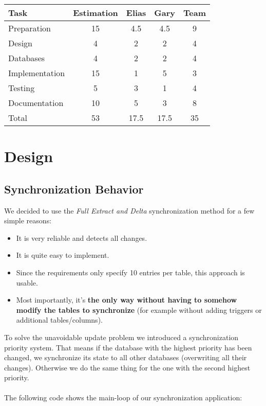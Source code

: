 \documentclass[11pt, a4paper]{article}
\begin{document}
\parskip 12pt
\begin{tabular} {| l | c | c | c | c |}
	\hline
	Task					&	Estimation		& 	Elias 	& 	Gary 	& 	Team	\\ \hline \hline
	Preparation				&	15				&	4.5		&  	4.5		&	9		\\ \hline
	Design					&	4				&	2		&	2		&	4		\\ \hline
	Databases				&	4				&	2  		&	2 		& 	4		\\ \hline
	Implementation			&	15				&	1		&	5		& 	3 		\\ \hline
	Testing					&	5				&	3		& 	1 		& 	4 		\\ \hline
	Documentation			&	10				&	5		&	3 		& 	8		\\ \hline 
	Total					&	53				&	17.5	&	17.5	& 	35		\\
	\hline
\end{tabular}

\section{Design}

\subsection {Synchronization Behavior}

We decided to use the \textit{Full Extract and Delta} synchronization method for a few simple reasons:

\vspace{-10pt}
\begin{itemize}[noitemsep]
	\item It is very reliable and detects all changes.
	\item It is quite easy to implement.
	\item Since the requirements only specify 10 entries per table, this approach is usable.
	\item Most importantly, it's \textbf{the only way without having to somehow modify the tables to synchronize} (for example without adding triggers or additional tables/columns).
\end{itemize}
\vspace{-10pt}

To solve the unavoidable update problem we introduced a synchronization priority system. That means if the database with the highest priority has been changed, we synchronize its state to all other databases (overwriting all their changes). Otherwise we do the same thing for the one with the second highest priority.
\\\\
The following code shows the main-loop of our synchronization application:
\end{document}
